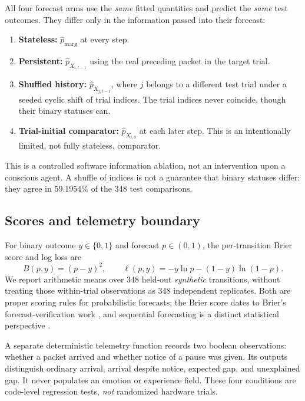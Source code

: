 \documentclass[11pt,a4paper]{article}
\begin{document}
All four forecast arms use the \emph{same} fitted quantities and predict the \emph{same} test outcomes. They differ only in the information passed into their forecast:
\begin{enumerate}[label=\textbf{\Alph*.}]
\item \textbf{Stateless:} $\widehat p_{\mathrm{marg}}$ at every step.
\item \textbf{Persistent:} $\widehat p_{X_{i,t-1}}$ using the real preceding packet in the target trial.
\item \textbf{Shuffled history:} $\widehat p_{X_{j,t-1}}$, where $j$ belongs to a different test trial under a seeded cyclic shift of trial indices. The trial indices never coincide, though their binary statuses can.
\item \textbf{Trial-initial comparator:} $\widehat p_{X_{i,0}}$ at each later step. This is an intentionally limited, not fully stateless, comparator.
\end{enumerate}
This is a controlled software information ablation, not an intervention upon a conscious agent. A shuffle of indices is not a guarantee that binary statuses differ: they agree in $59.1954\%$ of the 348 test comparisons.

\subsection{Scores and telemetry boundary}
For binary outcome $y\in\{0,1\}$ and forecast $p\in(0,1)$, the per-transition Brier score and log loss are
\begin{equation}\label{eq:scores}
 B(p,y)=(p-y)^2,\qquad
 \ell(p,y)=-y\ln p-(1-y)\ln(1-p).
\end{equation}
We report arithmetic means over 348 held-out \emph{synthetic} transitions, without treating those within-trial observations as 348 independent replicates. Both are proper scoring rules for probabilistic forecasts; the Brier score dates to Brier's forecast-verification work \cite{brier1950}, and sequential forecasting is a distinct statistical perspective \cite{dawid1984}.

A separate deterministic telemetry function records two boolean observations: whether a packet arrived and whether notice of a pause was given. Its outputs distinguish ordinary arrival, arrival despite notice, expected gap, and unexplained gap. It never populates an emotion or experience field. These four conditions are code-level regression tests, \emph{not} randomized hardware trials.
\end{document}
